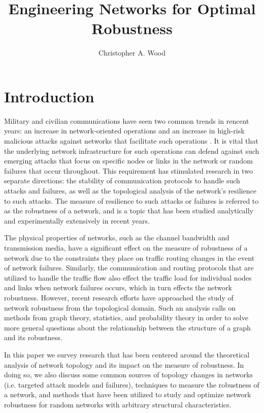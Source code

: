 \documentclass[doc]{apa}%
\title{Engineering Networks for Optimal Robustness}
\author{Christopher A. Wood}
\affiliation{Department of Computer Science \\ Rochester Institute of Technology}
\begin{document}
\maketitle   

\section{Introduction}

Military and civilian communications have seen two common trends in rencent years: an increase in network-oriented operations and an increase in high-risk malicious attacks against networks that facilitate such operations \cite{Bernardnetworkrobustness}. It is vital that the underlying network infrastructure for such operations can defend against such emerging attacks that focus on specific nodes or links in the network or random failures that occur throughout. This requirement has stimulated research in two separate directions: the stability of communication protocols to handle such attacks and failures, as well as the topological analysis of the network's resilience to such attacks. The measure of resilience to such attacks or failures is referred to as the robustness of a network, and is a topic that has been studied analytically and experimentally extensively in recent years.

The physical properties of networks, such as the channel bandwidth and transmission media, have a significant effect on the measure of robustness of a network due to the constraints they place on traffic routing changes in the event of network failures. Similarly, the communication and routing protocols that are utilized to handle the traffic flow also effect the traffic load for individual nodes and links when network failures occurs, which in turn effects the network robustness. However, recent research efforts have approached the study of network robustness from the topological domain. Such an analysis calls on methods from graph theory, statistics, and probability theory in order to solve more general questions about the relationship between the structure of a graph and its robustness.

In this paper we survey research that has been centered around the theoretical analysis of network topology and its impact on the measure of robustness. In doing so, we also discuss some common sources of topology changes in networks (i.e. targeted attack models and failures), techniques to measure the robustness of a network, and methods that have been utilized to study and optimize network robustness for random networks with arbitrary structural characteristics.
\end{document}
